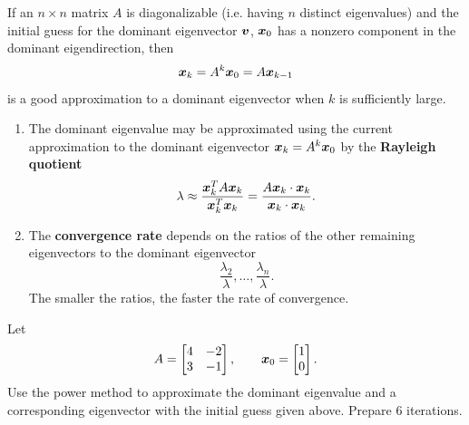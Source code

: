 \begin{theorem}
If an $n\times n$ matrix $A$ is diagonalizable (i.e. having $n$ distinct eigenvalues) and the initial guess for the dominant eigenvector $\boldsymbol{v}$, $\boldsymbol{x}_0$ has a nonzero component in the dominant eigendirection, then
\[
\boldsymbol{x}_k = A^k\boldsymbol{x}_0 = A \boldsymbol{x}_{k-1}
\]
is a good approximation to a dominant eigenvector when $k$ is sufficiently large.
\end{theorem}

\begin{enumerate}[label=(\alph*)]
\item The dominant eigenvalue may be approximated using the current approximation to the dominant eigenvector $\boldsymbol{x}_k = A^k\boldsymbol{x}_0$ by the \textbf{Rayleigh quotient}
\[
\lambda \approx \frac{\boldsymbol{x}_k^T A\boldsymbol{x}_k}{\boldsymbol{x}_k^T\boldsymbol{x}_k} = \frac{A\boldsymbol{x}_k \cdot \boldsymbol{x}_k}{\boldsymbol{x}_k \cdot \boldsymbol{x}_k}.
\]
\item The \textbf{convergence rate} depends on the ratios of the other remaining eigenvectors to the dominant eigenvector
\[
\frac{\lambda_2}{\lambda}, \dots , \frac{\lambda_n}{\lambda}.
\]
The smaller the ratios, the faster the rate of convergence.
\end{enumerate}


\begin{example}
Let
\[
 A=\begin{bmatrix}4&-2\\3&-1\end{bmatrix},
 \qquad
 \boldsymbol{x}_0=\begin{bmatrix}1\\0\end{bmatrix}.
\]
Use the power method to approximate the dominant eigenvalue and a corresponding eigenvector with the initial guess given above. Prepare 6 iterations.
\end{example}

